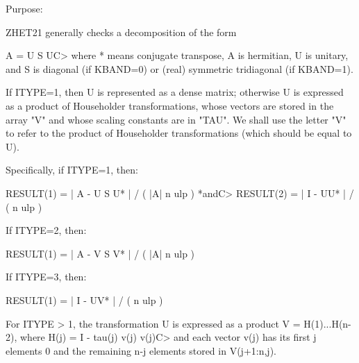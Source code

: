 \begin{DoxyParagraph}{Purpose\+: }
\begin{DoxyVerb} ZHET21 generally checks a decomposition of the form

    A = U S UC>
 where * means conjugate transpose, A is hermitian, U is unitary, and
 S is diagonal (if KBAND=0) or (real) symmetric tridiagonal (if
 KBAND=1).

 If ITYPE=1, then U is represented as a dense matrix; otherwise U is
 expressed as a product of Householder transformations, whose vectors
 are stored in the array "V" and whose scaling constants are in "TAU".
 We shall use the letter "V" to refer to the product of Householder
 transformations (which should be equal to U).

 Specifically, if ITYPE=1, then:

    RESULT(1) = | A - U S U* | / ( |A| n ulp ) *andC>    RESULT(2) = | I - UU* | / ( n ulp )

 If ITYPE=2, then:

    RESULT(1) = | A - V S V* | / ( |A| n ulp )

 If ITYPE=3, then:

    RESULT(1) = | I - UV* | / ( n ulp )

 For ITYPE > 1, the transformation U is expressed as a product
 V = H(1)...H(n-2),  where H(j) = I  -  tau(j) v(j) v(j)C> and each
 vector v(j) has its first j elements 0 and the remaining n-j elements
 stored in V(j+1:n,j).\end{DoxyVerb}
 
\end{DoxyParagraph}

